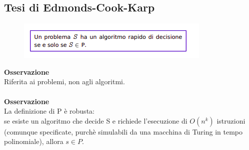 \subsection{Tesi di Edmonds-Cook-Karp}
\begin{figure}[htp]
    \centering
    \includegraphics[scale=0.9]{tesi_stile/img/f10cap9.png}
\end{figure}
\textbf{Osservazione}\\
Riferita ai problemi, non agli algoritmi.\\\\
\textbf{Osservazione}\\
La definizione di P è robusta:\\
se esiste un algoritmo che decide S e richiede l’esecuzione di $O(n^k)$ istruzioni (comunque specificate, purchè simulabili da una macchina di Turing in tempo polinomiale), allora $s \in P$.





